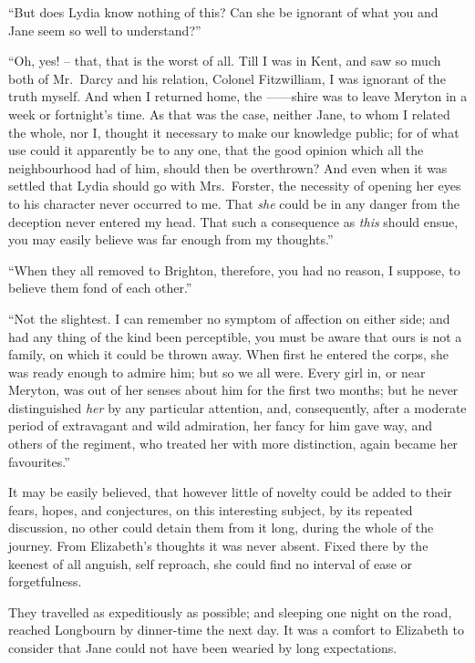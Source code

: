 “But does Lydia know nothing of this? Can she be
ignorant of what you and Jane seem so well to
understand?”

“Oh, yes! -- that, that is the worst of all. Till I was
in Kent, and saw so much both of Mr.\ Darcy and his
relation, Colonel Fitzwilliam, I was ignorant of the truth
myself. And when I returned home, the ------shire was
to leave Meryton in a week or fortnight’s time. As that
was the case, neither Jane, to whom I related the whole,
nor I, thought it necessary to make our knowledge public;
for of what use could it apparently be to any one, that
the good opinion which all the neighbourhood had of
him, should then be overthrown? And even when it was
settled that Lydia should go with Mrs.\ Forster, the necessity
of opening her eyes to his character never occurred
to me. That \textit{she} could be in any danger from the deception
never entered my head. That such a consequence as \textit{this}
should ensue, you may easily believe was far enough from
my thoughts.”

“When they all removed to Brighton, therefore, you
had no reason, I suppose, to believe them fond of each
other.”

“Not the slightest. I can remember no symptom of
affection on either side; and had any thing of the kind
been perceptible, you must be aware that ours is not a
family, on which it could be thrown away. When first
he entered the corps, she was ready enough to admire
him; but so we all were. Every girl in, or near Meryton,
was out of her senses about him for the first two months;
but he never distinguished \textit{her} by any particular attention,
and, consequently, after a moderate period of extravagant
and wild admiration, her fancy for him gave way, and others
of the regiment, who treated her with more distinction,
again became her favourites.”

\strut

It may be easily believed, that however little of novelty
could be added to their fears, hopes, and conjectures, on
this interesting subject, by its repeated discussion, no
other could detain them from it long, during the whole
of the journey. From Elizabeth’s thoughts it was never
absent. Fixed there by the keenest of all anguish, self
reproach, she could find no interval of ease or
forgetfulness.

They travelled as expeditiously as possible; and sleeping
one night on the road, reached Longbourn by dinner-time
the next day. It was a comfort to Elizabeth to consider
that Jane could not have been wearied by long
expectations.

